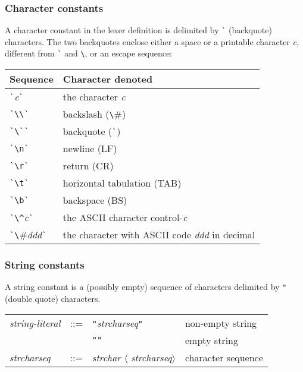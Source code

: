 \documentclass[fleqn]{article}
\begin{document}
\subsubsection{Character constants}
\label{sec-character-constants}

A character constant in the lexer definition is delimited by \verb#`#
(backquote) characters.  The two backquotes enclose either a space or
a printable character {\it c\/}, different from \verb#`# and \verb#\#,
or an escape sequence:

\begin{quot}
\begin{tabular}{@{}|l|l|}\hline
Sequence & Character denoted \\\hline
\verb#`#{\it c\/}\verb#`# & the character {\it c\/}\\
\verb#`\\`#        &  backslash (\verb#\#)\\
\verb#`\``#               & backquote (\verb#`#)\\
\verb#`\n`#       & newline (LF)\\
\verb#`\r`#       & return (CR)\\
\verb#`\t`#       & horizontal tabulation (TAB)\\
\verb#`\b`#       & backspace (BS)\\
\verb#`\^#{\it c\/}\verb#`#      & the ASCII character control-{\it c\/}\\
\verb#`\#{\it ddd\/}\verb#`#     & the character with ASCII code {\it ddd\/} in
decimal\\\hline 
\end{tabular}
\end{quot}

\subsubsection{String constants}
\label{sec-string-constants}

A string constant is a (possibly empty) sequence of characters
delimited by {\tt "} (double quote) characters.

\begin{quot}
\begin{tabular}{lcll}
  {\it string-literal\/} & ::= & {\tt "}{\it strcharseq\/}{\tt "}
        & non-empty string\\
  & &                            {\tt ""} & empty string\\[2ex]

{\it strcharseq\/} & ::= & {\it strchar\/} $\langle${\it
  strcharseq\/}$\rangle$ & character sequence
\end{tabular}
\end{quot}
\end{document}
